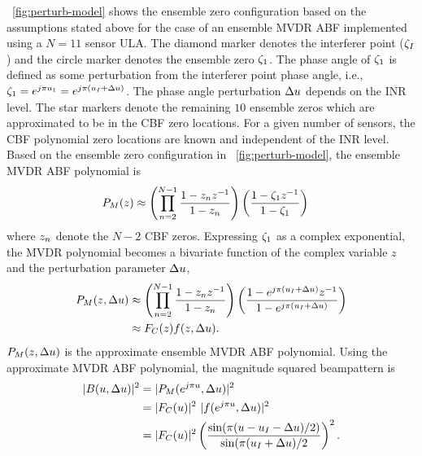 \figurename{}~\ref{fig:perturb-model} shows the ensemble zero
configuration based on the assumptions stated above for the case of an
ensemble MVDR ABF implemented using a $N = 11$ sensor ULA. The diamond
marker denotes the interferer point ($\zeta_I$) and the circle marker
denotes the ensemble zero $\zeta_1$. The phase angle of $\zeta_1$ is
defined as some perturbation from the interferer point phase angle,
i.e., $\zeta_1 = e^{j\pi u_1} =e^{j\pi(u_I + \Delta u)}$. The
phase angle perturbation $\Delta u$ depends on the INR level. The star
markers denote the remaining $10$ ensemble zeros which are
approximated to be in the CBF zero locations. For a given number of sensors, the CBF polynomial zero locations are known and independent of the INR level. Based on the ensemble zero configuration in
\figurename{}~\ref{fig:perturb-model}, the ensemble MVDR ABF
polynomial is
\begin{align*} 
  {P}_M(z) &\approx \left(\prod\limits_{n=2}^{N-1}\frac{1 - z_n z^{-1}}{1 - z_n}\right) \left(\frac{1 - \zeta_1 z^{-1}}{1 - \zeta_1}\right)
\end{align*}
where $z_n$ denote the $N-2$ CBF zeros. Expressing $\zeta_1$ as a
complex exponential, the MVDR polynomial becomes a bivariate function
of the complex variable $z$ and the perturbation parameter $\Delta u$,
\begin{align}
  \label{eq:mvdr-approx-poly}
  {P}_M(z, \Delta u)  &\approx \left(\prod\limits_{n=2}^{N-1}\frac{1 - z_n z^{-1}}{1 - z_n}\right) \left(\frac{1 - e^{j\pi(u_I + \Delta u)}z^{-1}}{1 - e^{j\pi(u_I + \Delta u)}}\right) \nonumber \\
                         &\approx F_C(z)f(z, \Delta u).
\end{align}
$ {P}_M(z, \Delta u)$ is the approximate ensemble MVDR ABF
polynomial.  Using the approximate MVDR ABF polynomial, the magnitude
squared beampattern is
\begin{align} 
  \label{eq:bp-poly-perturb}
  |B(u, \Delta u)|^2  &= |{P}_M(e^{j\pi u}, \Delta u)|^2 \nonumber\\
  &= |F_C(u)|^2 \
  |f(e^{j\pi u}, \Delta u) |^2 \nonumber\\
  &= |F_C(u)|^2 \left( \frac{\sin(\pi(u - u_I -
      \Delta u)/2)}{\sin(\pi(u_I + \Delta u)/2} \right)^2.
\end{align}

